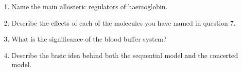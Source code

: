 \begin{enumerate}

\item Name the main allosteric regulators of haemoglobin.


\item Describe the effects of each of the molecules you have named in question 7.


\item What is the significance of the blood buffer system?


\item Describe the basic idea behind both the sequential model and the concerted model.


\end{enumerate}
